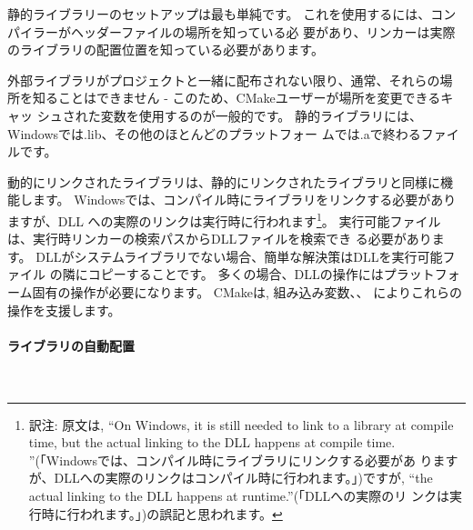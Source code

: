 \documentclass[11pt,a4paper,landscape]{ltjsarticle}
\newcommand{\sectiontitle}[1]{\paragraph{#1} \ \\} %
\begin{document}
\begin{multicols}{2}
静的ライブラリーのセットアップは最も単純です。
これを使用するには、コンパイラーがヘッダーファイルの場所を知っている必
要があり、リンカーは実際のライブラリの配置位置を知っている必要があります。

外部ライブラリがプロジェクトと一緒に配布されない限り、通常、それらの場
所を知ることはできません - このため、CMakeユーザーが場所を変更できるキャッ
シュされた変数を使用するのが一般的です。
静的ライブラリには、Windowsでは.lib、その他のほとんどのプラットフォー
ムでは.aで終わるファイルです。




動的にリンクされたライブラリは、静的にリンクされたライブラリと同様に機
能します。
Windowsでは、コンパイル時にライブラリをリンクする必要がありますが、DLL
への実際のリンクは実行時に行われます\footnote{訳注: 原文は, ``On
  Windows, it is still needed to link to a library at compile time,
  but the actual linking to the DLL happens at compile
  time. ''(「Windowsでは、コンパイル時にライブラリにリンクする必要があ
    りますが、DLLへの実際のリンクはコンパイル時に行われます。」)ですが,
  ``the actual linking to the DLL happens at runtime.''(「DLLへの実際のリ
  ンクは実行時に行われます。」)の誤記と思われます。}。
実行可能ファイルは、実行時リンカーの検索パスからDLLファイルを検索でき
る必要があります。
DLLがシステムライブラリでない場合、簡単な解決策はDLLを実行可能ファイル
の隣にコピーすることです。
多くの場合、DLLの操作にはプラットフォーム固有の操作が必要になります。
CMakeは, 組み込み変数、、
によりこれらの操作を支援します。



\sectiontitle{ライブラリの自動配置}



\end{multicols}
\end{document}
